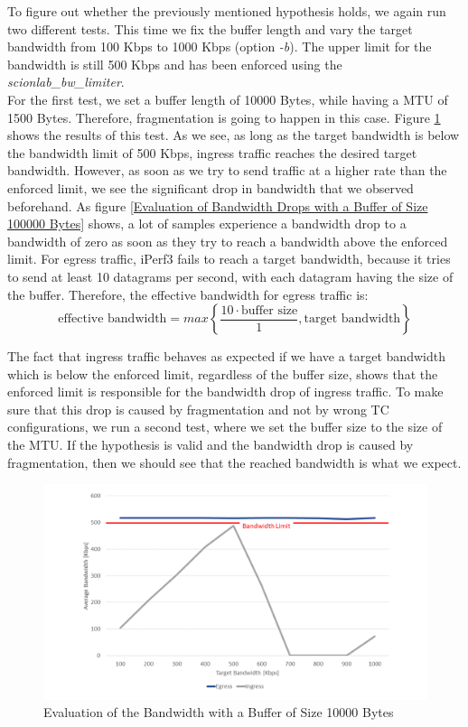 To figure out whether the previously mentioned hypothesis holds, we again run two different tests. This time we fix the buffer length and vary the target bandwidth from 100 Kbps to 1000 Kbps (option \textit{-b}). The upper limit for the bandwidth is still 500 Kbps and has been enforced using the \textit{scionlab\_bw\_limiter}. 
\\
For the first test, we set a buffer length of 10000 Bytes, while having a \acs{MTU} of 1500 Bytes. Therefore, fragmentation is going to happen in this case. Figure \ref{Evaluation of the Bandwidth with a Buffer of Size 10000 Bytes} shows the results of this test. As we see, as long as the target bandwidth is below the bandwidth limit of 500 Kbps, ingress traffic reaches the desired target bandwidth. However, as soon as we try to send traffic at a higher rate than the enforced limit, we see the significant drop in bandwidth that we observed beforehand. As figure \ref{Evaluation of Bandwidth Drops with a Buffer of Size 100000 Bytes} shows, a lot of samples experience a bandwidth drop to a bandwidth of zero as soon as they try to reach a bandwidth above the enforced limit. For egress traffic, iPerf3 fails to reach a target bandwidth, because it tries to send at least 10 datagrams per second, with each datagram having the size of the buffer. Therefore, the effective bandwidth for egress traffic is: 
$$\text{effective bandwidth} = max\left\lbrace\frac{10\cdot \text{buffer size}}{1},\text{target bandwidth}\right\rbrace$$ 

The fact that ingress traffic behaves as expected if we have a target bandwidth which is below the enforced limit, regardless of the buffer size, shows that the enforced limit is responsible for the bandwidth drop of ingress traffic. To make sure that this drop is caused by fragmentation and not by wrong \acs{TC} configurations, we run a second test, where we set the buffer size to the size of the \acs{MTU}. If the hypothesis is valid and the bandwidth drop is caused by fragmentation, then we should see that the reached bandwidth is what we expect.

\begin{figure}[h]
	\centering
	\includegraphics[width=\textwidth]{img/Evaluation-Bandwidth-Big-Buffer.png}
	\caption{Evaluation of the Bandwidth with a Buffer of Size 10000 Bytes}
	\label{Evaluation of the Bandwidth with a Buffer of Size 10000 Bytes}
\end{figure}

